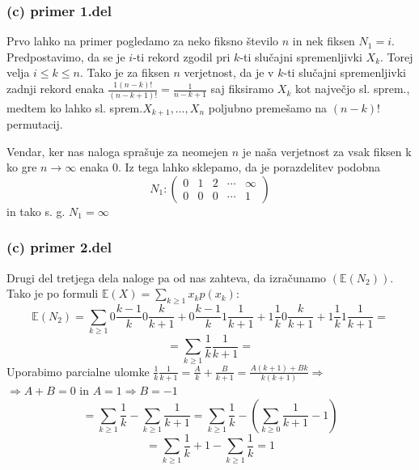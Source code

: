 \documentclass[12pt, hyperref={unicode}]{beamer}
\begin{document}
\begin{frame}
  
  \frametitle{(c) primer 1.del}
  Prvo lahko na primer pogledamo za neko fiksno število $n$ in nek fiksen $N_1=i$.
  Predpostavimo, da se je $i$-ti rekord zgodil pri $k$-ti slučajni spremenljivki $X_k$. Torej velja $i\leq k \leq n$.
  Tako je za fiksen $n$ verjetnost, da je v $k$-ti slučajni spremenljivki zadnji rekord enaka $\frac{1(n-k)!}{(n-k+1)!}=\frac{1}{n-k+1}$
  saj fiksiramo $X_k$ kot največjo sl. sprem., medtem ko lahko sl. sprem.$X_{k+1},\dots , X_n$ poljubno premešamo na $(n-k)!$ permutacij.
  \vspace{3mm}

  Vendar, ker nas naloga sprašuje za neomejen $n$ je naša verjetnost za vsak fiksen k ko gre $n\rightarrow \infty$ enaka $0$.
  Iz tega lahko sklepamo, da je porazdelitev podobna $$N_1: \left( \begin{array}{ccccc} 0 & 1 & 2 & \cdots & \infty\\
    0 & 0 & 0 & \cdots & 1 \end{array}\right)$$ in tako s. g. $N_1=\infty$
  
\end{frame}

\begin{frame}
  
  \frametitle{(c) primer 2.del}
  Drugi del tretjega dela naloge pa od nas zahteva, da izračunamo
  $(\mathbb{E}(N_2))$. Tako je po formuli $\mathbb{E}(X)=\sum_{k\geq1} x_kp(x_k)$:
  $$\mathbb{E}(N_2)=\sum_{k\geq1} 0\frac{k-1}{k}0\frac{k}{k+1} + 0\frac{k-1}{k}1\frac{1}{k+1} + 1\frac{1}{k}0\frac{k}{k+1} + 1\frac{1}{k}1\frac{1}{k+1} =$$
  $$ = \sum_{k\geq1} \frac{1}{k}\frac{1}{k+1} =$$
  Uporabimo parcialne ulomke $\frac{1}{k}\frac{1}{k+1} = \frac{A}{k} + \frac{B}{k+1} =
  \frac{A(k+1) + Bk}{k(k+1)} \Rightarrow$ \\
  $\Rightarrow A + B = 0$ in $A = 1 \Rightarrow B = -1$
  $$ = \sum_{k\geq1} \frac{1}{k} - \sum_{k\geq1} \frac{1}{k+1} = \sum_{k\geq1} \frac{1}{k} - (\sum_{k\geq0} \frac{1}{k+1} - 1)$$
  $$ = \sum_{k\geq1} \frac{1}{k} + 1 - \sum_{k\geq1} \frac{1}{k} = 1$$


\end{frame}
\end{document}
